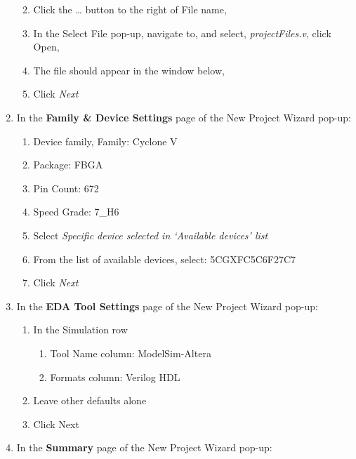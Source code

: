 \begin{enumerate}
        \begin{enumerate}
                \def\labelenumii{\alph{enumii}.}
            \item
                Click the \ldots{} button to the right of File name,
            \item
                In the Select File pop-up, navigate to, and select,
                \emph{projectFiles.v}, click Open,
            \item
                The file should appear in the window below,
            \item
                Click \emph{Next}
        \end{enumerate}
    \item
        In the \textbf{Family \& Device Settings} page of the New Project
        Wizard pop-up:

        \begin{enumerate}
                \def\labelenumii{\alph{enumii}.}
            \item
                Device family, Family: Cyclone V
            \item
                Package: FBGA
            \item
                Pin Count: 672
            \item
                Speed Grade: 7\_H6
            \item
                Select \emph{Specific device selected in `Available devices' list}
            \item
                From the list of available devices, select: 5CGXFC5C6F27C7
            \item
                Click \emph{Next}
        \end{enumerate}
    \item
        In the \textbf{EDA Tool Settings} page of the New Project Wizard
        pop-up:

        \begin{enumerate}
                \def\labelenumii{\alph{enumii}.}
            \item
                In the Simulation row

                \begin{enumerate}
                        \def\labelenumiii{\roman{enumiii}.}
                    \item
                        Tool Name column: ModelSim-Altera
                    \item
                        Formats column: Verilog HDL
                \end{enumerate}
            \item
                Leave other defaults alone
            \item
                Click Next
        \end{enumerate}
    \item
        In the \textbf{Summary} page of the New Project Wizard pop-up:


\end{enumerate}
